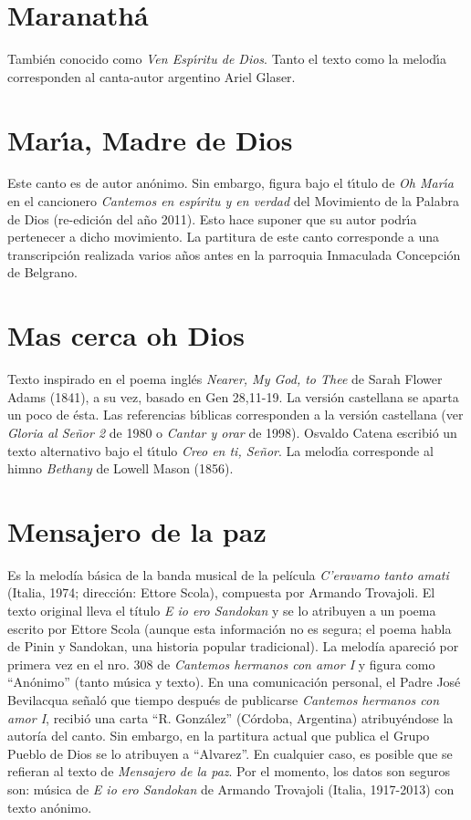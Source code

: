 \documentclass[landscape,12pt]{report}
\begin{document}
\section*{\small Maranath\'a} \noindent\footnotesize Tambi\'en conocido como \textit{Ven Esp\'\i ritu de Dios}. Tanto el texto como la melod\'\i a corresponden al canta-autor argentino Ariel Glaser. 
\section*{\small Mar\'\i a, Madre de Dios} \noindent\footnotesize Este canto es de autor an\'onimo. Sin embargo, figura bajo el t\'\i tulo de \textit{Oh Mar\'\i a} en el cancionero \textit{Cantemos en esp\'\i ritu y en verdad} del Movimiento de la Palabra de Dios (re-edici\'on del a\~no 2011). Esto hace suponer que su autor podr\'\i a pertenecer a dicho movimiento. La partitura de este canto corresponde a una transcripci\'on realizada varios a\~nos antes en la parroquia Inmaculada Concepci\'on de Belgrano.    
\section*{\small Mas cerca oh Dios} \noindent\footnotesize Texto inspirado en el 
poema ingl\'es \textit{Nearer, My God, to Thee} de Sarah Flower Adams (1841), a 
su vez, basado en Gen 28,11-19. La versi\'on castellana se aparta un poco de 
\'esta. Las referencias b\'\i blicas corresponden a la versi\'on castellana (ver 
\textit{Gloria al Se\~nor 2} de 1980 o \textit{Cantar y orar} de 1998). Osvaldo 
Catena escribi\'o un texto alternativo bajo el t\'\i tulo \textit{Creo en ti, 
Se\~nor}. La melod\'\i a corresponde al himno \textit{Bethany} de Lowell Mason 
(1856). 

\section*{\small Mensajero de la paz} \noindent\footnotesize 
Es la melodía básica de la banda musical de la película \textit{C'eravamo tanto 
amati} (Italia, 1974; dirección: Ettore Scola), compuesta por Armando 
Trovajoli. El texto original lleva el título \textit{E io ero Sandokan} y se 
lo atribuyen a un poema escrito por Ettore Scola (aunque esta información no 
es segura; el poema habla de Pinin y Sandokan, una historia popular 
tradicional). La melodía apareció por primera vez en el nro. 308 de 
\textit{Cantemos hermanos con amor I} y figura como ``Anónimo'' (tanto música y 
texto). En una comunicaci\'on personal, el Padre Jos\'e Bevilacqua se\~nal\'o 
que tiempo despu\'es de publicarse \textit{Cantemos hermanos con amor I}, 
recibi\'o una carta ``R. Gonz\'alez'' (C\'ordoba, Argentina) atribuyéndose la 
autoría del canto. Sin embargo, en la partitura actual que publica el Grupo 
Pueblo de Dios se lo atribuyen a ``Alvarez''. En cualquier caso, es posible 
que se refieran al texto de \textit{Mensajero de la paz}. Por el momento, los 
datos son seguros son: música de \textit{E io ero Sandokan} de Armando 
Trovajoli (Italia, 1917-2013) con texto anónimo.
\end{document}
